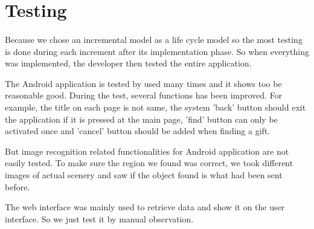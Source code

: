 \section{Testing}												
\label{sec:Testing}
\paragraph{} Because we chose an incremental model as a life cycle model so the most testing is done during each increment after its implementation phase. So when everything was implemented, the developer then tested the entire application.
\par The Android application is tested by used many times and it shows too be reasonable good. During the test, several functions has been improved. For example, the title on each page is not same, the system 'back' button should exit the application if it is pressed at the main page, 'find' button can only be activated once and 'cancel' button should be added when finding a gift.  
\par But image recognition related functionalities for Android application are not easily tested. To make sure the region we found was correct, we took different images of actual scenery and saw if the object found is what had been sent before. 
\par The web interface was mainly used to retrieve data and show it on the user interface. So we just test it by manual observation. 
